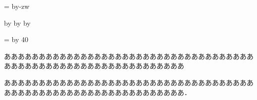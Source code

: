\documentclass[uplatex]{jsarticle}
\makeatletter
\def\mojiparline#1{
\newcounter{mpl}
\setcounter{mpl}{#1}
\@tempdima=\linewidth
\advance\@tempdima by-\value{mpl}zw
\addtocounter{mpl}{-1}
\divide\@tempdima by \value{mpl}
\advance\kanjiskip by\@tempdima
\advance\parindent by\@tempdima
}
\def\linesparpage#1{
\baselineskip=\textheight
\divide\baselineskip by #1
}
\newcommand{\myname}{○○ ○○}
\newcommand{\mynum}{○}
\makeatother
\begin{document}
\mojiparline{40}
\linesparpage{40}
\pagestyle{empty}

\begin{description}[style=multiline,topsep=0em,font=\textmc]
    \item[（イ）]
    ああああああああああああああああああああああああああああああああああああああああああああああああああああああああああああああ

    \item[（ロ）]  
    ああああああああああああああああああああああああああああああああああああああああああああああああああああああああああああああ．

\end{description}
\end{document}
